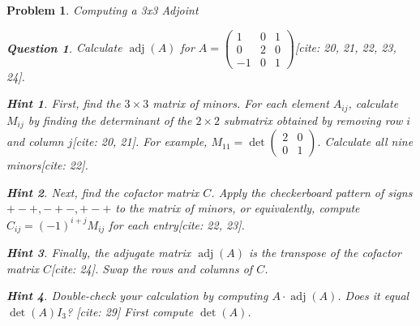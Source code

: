 \documentclass[12pt]{article}
\newtheorem{problem}{Problem}[section]
\newtheorem{question}{Question}[problem]
\theoremstyle{definition}
\newtheorem{hint}{Hint}[question]
\newcommand{\adj}{\operatorname{adj}}
\newcommand{\detm}{\operatorname{det}}
\begin{document}
\begin{problem}{Computing a 3x3 Adjoint}
    \begin{question}
        Calculate $\adj(A)$ for $A = \begin{pmatrix} 1 & 0 & 1 \\ 0 & 2 & 0 \\ -1 & 0 & 1 \end{pmatrix}$[cite: 20, 21, 22, 23, 24].
    \end{question}
    
        \begin{hint}
            First, find the $3 \times 3$ matrix of minors. For each element $A_{ij}$, calculate $M_{ij}$ by finding the determinant of the $2 \times 2$ submatrix obtained by removing row $i$ and column $j$[cite: 20, 21]. For example, $M_{11} = \detm \begin{pmatrix} 2 & 0 \\ 0 & 1 \end{pmatrix}$. Calculate all nine minors[cite: 22].
        \end{hint}
        \begin{hint}
            Next, find the cofactor matrix $C$. Apply the checkerboard pattern of signs $+ - +, - + -, + - +$ to the matrix of minors, or equivalently, compute $C_{ij} = (-1)^{i+j} M_{ij}$ for each entry[cite: 22, 23].
        \end{hint}
        \begin{hint}
            Finally, the adjugate matrix $\adj(A)$ is the transpose of the cofactor matrix $C$[cite: 24]. Swap the rows and columns of $C$.
        \end{hint}
        \begin{hint}
            Double-check your calculation by computing $A \cdot \adj(A)$. Does it equal $\detm(A) I_3$? [cite: 29] First compute $\detm(A)$.
        \end{hint}
    
\end{problem}
\end{document}
